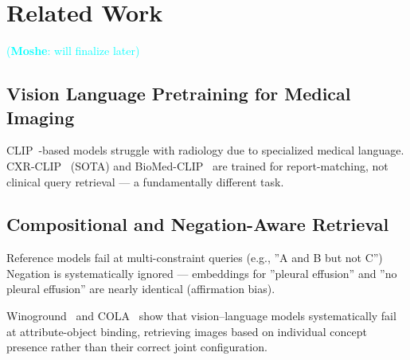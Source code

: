 \documentclass[10pt,twocolumn,letterpaper]{article}
\newcommand\mk[1]{\textcolor{cyan}{(\textbf{Moshe}: #1)}}
\begin{document}
\section{Related Work}
\mk{will finalize later}
\subsection{Vision Language Pretraining for Medical Imaging}

CLIP~\cite{radford2021learning}-based models struggle with radiology due to specialized medical language. CXR-CLIP~\cite{you2023cxrclip} (SOTA) and BioMed-CLIP~\cite{biomedclip} are trained for report-matching, not clinical query retrieval — a fundamentally different task.

\subsection{Compositional and Negation-Aware Retrieval}
Reference models fail at multi-constraint queries (e.g., ''A and B but not C'')
Negation is systematically ignored — embeddings for ''pleural effusion'' and ''no pleural effusion'' are nearly identical (affirmation bias).

Winoground~\cite{thrush2022winoground} 
and COLA~\cite{ray2023cola} show that vision--language models systematically 
fail at attribute-object binding, retrieving images based on individual concept 
presence rather than their correct joint configuration.



\end{document}
